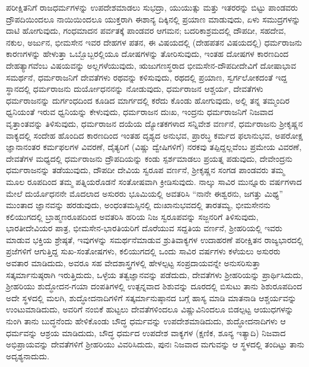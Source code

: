 ಪರೀಕ್ಷಿತನಿಗೆ ರಾಜಧರ್ಮಗಳನ್ನು ಉಪದೇಶಮಾಡಲು ಸುಭದ್ರಾ, ಯುಯುತ್ಸು ಮತ್ತು ಇತರರನ್ನು ಬಿಟ್ಟು ಪಾಂಡವರು ದ್ರೌಪದಿಯಿಂದಲೂ ನಾಯಿಯಿಂದಲೂ ಯುಕ್ತರಾಗಿ ಈಶಾನ್ಯ ದಿಕ್ಕಿನಲ್ಲಿ ಪ್ರಯಾಣ ಮಾಡುವುದು, ಏಳು ಸಮುದ್ರಗಳನ್ನು ದಾಟಿ ಹೋಗುವುದು, ಗಂಧ\-ಮಾದನ ಪರ್ವತಕ್ಕೆ ಪಾಂಡವರ ಆಗಮನ; ಬದರಿಕಾಶ್ರಮದಲ್ಲಿ ದೌಪದೀ, ಸಹದೇವ, ನಕುಲ, ಅರ್ಜುನ, ಭೀಮಸೇನ ಇವರ ದೇಹಗಳ ಪತನ, ಈ ವಿಷಯದಲ್ಲಿ (ದೇಹಪತನ ವಿಷಯದಲ್ಲಿ) ಧರ್ಮರಾಜನು ಕಾರಣಗಳನ್ನು ಹೇಳುತ್ತಾ ಒಬ್ಬೊಬ್ಬರಲ್ಲಿಯೂ ದೋಷಗಳನ್ನು ತೋರಿಸುವುದು, ಇಂತಹ ದೋಷಗಳ ಕಾರಣದಿಂದ ದೇಹತ್ಯಾಗವೆಂಬ ವಿಷಯವನ್ನು ಅಲ್ಲಗಳೆಯುವುದು, ಋಜುಗಣಸ್ಥರಾದ ಭೀಮಸೇನ-ದೌಪದೀದೇವಿಗೆ ದೋಷಾಭಾವ ಸಮರ್ಥನೆ, ಧರ್ಮರಾಜನಿಗೆ ದೇವತೆಗಳು ರಥವನ್ನು ಕಳಿಸುವುದು, ರಥದಲ್ಲಿ ಪ್ರಯಾಣ, ಸ್ವರ್ಗಲೋಕದಂತೆ ಇದ್ದ ಸ್ಥಾನದಲ್ಲಿ ಧರ್ಮರಾಜನು ದುರ್ಯೋಧನನನ್ನು ನೋಡುವುದು, ಧರ್ಮರಾಜನ ಆಶ್ಚರ್ಯ, ದೇವತೆಗಳು ಧರ್ಮರಾಜನನ್ನು ದುರ್ಗಂಧದಿಂದ ಕೂಡಿದ ಮಾರ್ಗದಲ್ಲಿ ಕರೆದು ಕೊಂಡು ಹೋಗುವುದು, ಅಲ್ಲಿ ತನ್ನ ತಮ್ಮಂದಿರ ಧ್ವನಿಯಂತೆ ಇರುವ ಧ್ವನಿಯನ್ನು ಕೇಳುವುದು, ಧರ್ಮರಾಜನ ದುಃಖ, ಇಂದ್ರನು ಧರ್ಮರಾಜನಿಗೆ ನಿಜವಾದ ವೃತ್ತಾಂತವನ್ನು ತಿಳಿಸುವುದು, ಧರ್ಮರಾಜನ ದಯೆಯ ದ್ಯೋತಕಗಳಾದ ಸನ್ನಿವೇಶ ವರ್ಣನೆ, ಧರ್ಮರಾಜನು ಶ‍್ರೀಕೃಷ್ಣನ ವಾಕ್ಯದಲ್ಲಿ ಸಂದೇಹ ಹೊಂದಿದ ಕಾರಣದಿಂದ ಇಂತಹ ದೃಶ್ಯದ ಅನುಭವ, ಪ್ರಾರಬ್ಧ ಕರ್ಮದ ಫಲಾನುಭವ, ಅಪರೋಕ್ಷ ಜ್ಞಾನಾನಂತರ ಕರ್ಮಫಲಗಳ ವಿವರಣೆ, ದೈತ್ಯರಿಗೆ (ವಿಷ್ಣು ದ್ವೇಷಿಗಳಿಗೆ) ನರಕವು ತಪ್ಪಿದ್ದಲ್ಲವೆಂಬ ಪ್ರಮೇಯ ವಿವರಣೆ, ದೇವತೆಗಳ ಮಧ್ಯದಲ್ಲಿ ಧರ್ಮರಾಜನು ದ್ರೌಪದಿಯನ್ನು ಕಂಡು ಸ್ಪರ್ಶಮಾಡಲು ಪ್ರಯತ್ನ ಪಡುವುದು, ದೇವೇಂದ್ರನು ಧರ್ಮರಾಜನನ್ನು ತಡೆಯುವುದು, ದೌಪದೀ ದೇವಿಯ ಸ್ವರೂಪ ವರ್ಣನೆ, ಶ‍್ರೀಕೃಷ್ಣನ ಸಂಗಡ ಪಾಂಡವರು ತಮ್ಮ ಮೂಲ ರೂಪದಿಂದ ತಮ್ಮ ಪತ್ನಿಯರೊಡನೆ ಸಂತೋಷವಾಗಿ ಕ್ರೀಡಿಸುವುದು. ನಾಲ್ಕು ಸಾವಿರ ಮುನ್ನೂರು ವರ್ಷಗಳಾದ ಮೇಲೆ ದುರ್ಯೊಧನನೇ ಮೊದಲಾದ ಅಸುರರು ಭೂಮಿಯಲ್ಲಿ ಅವತರಿಸಿ “ನಾನೇ ಈಶ್ವರನು, ಜಗತ್ತು ಮಿಥ್ಯ” ಮುಂತಾದ ಜ್ಞಾನವನ್ನು ಹರಡುವುದು, ಅಂಧಂತಮಸ್ಸಿನಲ್ಲಿ ದುಃಖಾನುಭವದಲ್ಲಿ ತಾರತಮ್ಯ, ಭೀಮಸೇನನು ಕಲಿಯುಗದಲ್ಲಿ ಬ್ರಾಹ್ಮಣರೂಪದಿಂದ ಅವತರಿಸಿ ಹರಿಯ ನಿಜ ಸ್ವರೂಪವನ್ನು ಸಜ್ಜನರಿಗೆ ತಿಳಿಸುವುದು, ಭಾರತೀದೇವಿಯರ ಪಾತ್ರ, ಭೀಮಸೇನ-ಭಾರತಿಯರಿಗೆ ದೊರೆಯುವ ಸದ್ದತಿಯ ವರ್ಣನೆ, ಶ‍್ರೀಹರಿಯಲ್ಲಿ ಇವರು ಮಾಡುವ ಭಕ್ತಿಯ ಶ್ರೇಷ್ಠತೆ, ಇವುಗಳನ್ನು ಸಮರ್ಥನೆಮಾಡುವ ಶ್ರುತಿವಾಕ್ಯಗಳ ಉದಾಹರಣೆ ಪರೀಕ್ಷಿತನ ರಾಜ್ಯಭಾರದಲ್ಲಿ ಪ್ರಜೆಗಳಿಗೆ ಆಗುತ್ತಿದ್ದ ಸುಖ-\-ಸಂತೋಷಗಳು, ಕಲಿಯುಗದಲ್ಲಿ ಒಂದು ಸಾವಿರ ವರ್ಷಗಳು ಕಳೆಯಲು ಅಸುರರು ಅವತಾರ ಮಾಡಿದುದು, ಅವರೂ ಸಹ ವೇದ\-ಶಾಸ್ತ್ರಗಳಲ್ಲಿ ಹೇಳಲ್ಪಟ್ಟ ಸಂಪ್ರದಾಯವನ್ನೇ ಅನುಸರಿಸುತ್ತಾ ಸತ್ಕರ್ಮಾನುಷ್ಠರಾಗಿ ಇರುತ್ತಿದುದು, ಒಳ್ಳೆಯ ತತ್ವಜ್ಞಾನವನ್ನು ಪಡೆದುದು, ದೇವತೆಗಳು ಶ‍್ರೀಹರಿಯನ್ನು ಪ್ರಾರ್ಥಿಸಿದುದು, ಶ‍್ರೀಹರಿಯು ಶುದ್ಧೋದನ-ಗಯಾ ದಂಪತಿಗಳಲ್ಲಿ ಉತ್ಪನ್ನವಾದ ಶಿಶುವನ್ನು ದೂರದಲ್ಲಿ ಬಿಸುಟು ತಾನು ಶಿಶುರೂಪದಿಂದ ಅದೇ ಸ್ಥಳದಲ್ಲಿ ಮಲಗಿ, ಶುದ್ಧೋದನಾದಿಗಳಿಗೆ ಸತ್ಕರ್ಮಾನುಷ್ಠಾನದ ಬಗ್ಗೆ ಹಾಸ್ಯ ಮಾಡಿ ಮಾತನಾಡಿ ಆಶ್ಚರ್ಯವನ್ನು ಉಂಟುಮಾಡಿದುದು, ಅವರಿಗೆ ನಂಬಿಕೆ ಹುಟ್ಟಲು ದೇವತೆಗಳಿಂದಲೂ ವಿಷ್ಣುವಿ\-ನಿಂದಲೂ ಬಿಡಲ್ಪಟ್ಟ ಆಯುಧಗಳನ್ನು ನುಂಗಿ ತಾನು ಬುದ್ಧನೆಂದು ಹೇಳಿಕೊಂಡು ಬೌದ್ಧ ಧರ್ಮವನ್ನು ಉಪದೇಶಮಾಡಿದುದು, ಶುದ್ಧೋದನಾದಿಗಳು ಆ ಧರ್ಮವನ್ನು ಆಶ್ರಯ ಮಾಡಿದುದು, ಬೌದ್ಧ ಧರ್ಮದ ಉಪದೇಶ ವಾಕ್ಯಗಳ (ಕ್ಷಣಿಕ, ಶೂನ್ಯ ಇತ್ಯಾದಿ) ನಿಜವಾದ ಅಭಿಪ್ರಾಯವನ್ನು ದೇವತೆಗಳಿಗೆ ಶ‍್ರೀಹರಿಯು ವಿವರಿಸಿದುದು, ಪುನಃ ನಿಜವಾದ ಮಗುವನ್ನು ಆ ಸ್ಥಳದಲ್ಲಿ ತಂದಿಟ್ಟು ತಾನು ಅದೃಶ್ಯನಾದುದು.

